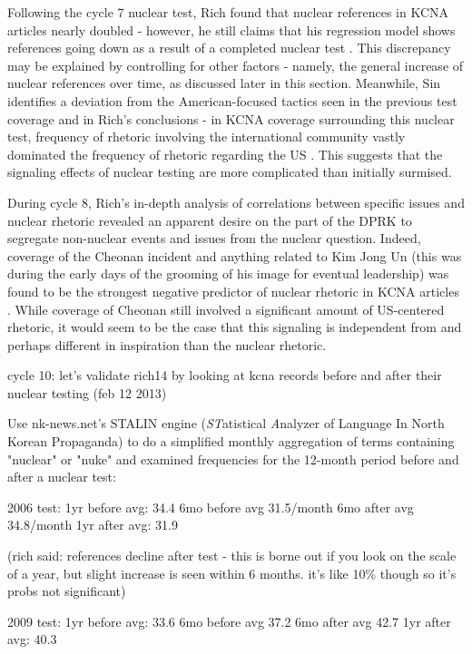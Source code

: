 \documentclass{article}
\begin{document}
Following the cycle 7 nuclear test, Rich found that nuclear references in KCNA articles nearly doubled - however, he still claims that his regression model shows references going down as a result of a completed nuclear test \cite{rich14}. This discrepancy may be explained by controlling for other factors - namely, the general increase of nuclear references over time, as discussed later in this section. Meanwhile, Sin identifies a deviation from the American-focused tactics seen in the previous test coverage and in Rich's conclusions - in KCNA coverage surrounding this nuclear test, frequency of rhetoric involving the international community vastly dominated the frequency of rhetoric regarding the US \cite{sin}. This suggests that the signaling effects of nuclear testing are more complicated than initially surmised.

During cycle 8, Rich's in-depth analysis of correlations between specific issues and nuclear rhetoric revealed an apparent desire on the part of the DPRK to segregate non-nuclear events and issues from the nuclear question. Indeed, coverage of the Cheonan incident and anything related to Kim Jong Un (this was during the early days of the grooming of his image for eventual leadership) was found to be the strongest negative predictor of nuclear rhetoric in KCNA articles \cite{rich12}. While coverage of Cheonan still involved a significant amount of US-centered rhetoric\cite{sin}, it would seem to be the case that this signaling is independent from and perhaps different in inspiration than the nuclear rhetoric.



cycle 10:
let's validate rich14 by looking at kcna records before and after their nuclear testing (feb 12 2013)

Use nk-news.net's STALIN engine (\emph{ST}atistical \emph{A}nalyzer of Language In North Korean Propaganda) to do a simplified monthly aggregation of terms containing "nuclear" or "nuke" and examined frequencies for the 12-month period before and after a nuclear test:

2006 test:
1yr before avg: 34.4
6mo before avg 31.5/month
6mo after avg 34.8/month
1yr after avg: 31.9

(rich said: references decline after test - this is borne out if you look on the scale of a year, but slight increase is seen within 6 months. it's like 10\% though so it's probs not significant)

2009 test:
1yr before avg: 33.6
6mo before avg 37.2
6mo after avg 42.7
1yr after avg: 40.3
\end{document}

